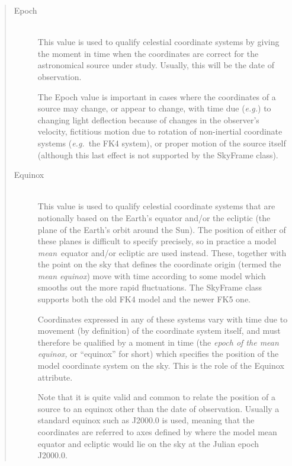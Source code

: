 \documentclass[twoside,11pt]{article}
\newenvironment{latexonly}{}{}
\newcommand{\htmlref}[2]{#1}
\begin{document}
\begin{quote}
\begin{description}
\item[\htmlref{Epoch}{Epoch}]\begin{latexonly}\mbox{}\\ \end{latexonly}
This value is used to qualify celestial coordinate systems by giving
the moment in time when the coordinates are correct for the
astronomical source under study. Usually, this will be the date of
observation.

The Epoch value is important in cases where the coordinates of a
source may change, or appear to change, with time due ({\em{e.g.}}) to
changing light deflection because of changes in the observer's
velocity, fictitious motion due to rotation of non-inertial coordinate
systems ({\em{e.g.}}\ the FK4 system), or proper motion of the source
itself (although this last effect is not supported by the SkyFrame
class).

\item[\label{ss:equinoxitem}\htmlref{Equinox}{Equinox}]\begin{latexonly}\mbox{}\\ \end{latexonly}
This value is used to qualify celestial coordinate systems that are
notionally based on the Earth's equator and/or the ecliptic (the plane
of the Earth's orbit around the Sun). The position of either of these
planes is difficult to specify precisely, so in practice a model
{\em{mean}}\ equator and/or ecliptic are used instead. These, together
with the point on the sky that defines the coordinate origin (termed
the {\em{mean equinox}}) move with time according to some model which
smooths out the more rapid fluctuations. The SkyFrame class supports
both the old FK4 model and the newer FK5 one.

Coordinates expressed in any of these systems vary with time due to
movement (by definition) of the coordinate system itself, and must
therefore be qualified by a moment in time (the {\em{epoch of the mean
equinox,}} or ``equinox'' for short) which specifies the position of
the model coordinate system on the sky. This is the role of the
Equinox attribute.

Note that it is quite valid and common to relate the position of a
source to an equinox other than the date of observation. Usually a
standard equinox such as J2000.0 is used, meaning that the coordinates
are referred to axes defined by where the model mean equator and
ecliptic would lie on the sky at the Julian epoch J2000.0.
\end{description}
\end{quote}
\end{document}
